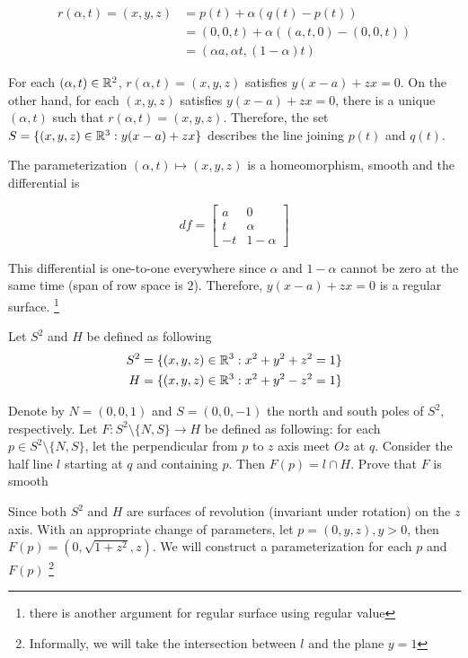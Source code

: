 \documentclass{article}
\begin{document}
\begin{align*}
    r(\alpha, t) = (x, y, z)
    &= p(t) + \alpha(q(t) - p(t)) \\
    &= (0, 0, t) + \alpha ((a, t, 0) - (0, 0, t)) \\
    &= (\alpha a, \alpha t, (1 - \alpha) t)
\end{align*}

For each $(\alpha, t) \in \mathbb{R}^2$, $r(\alpha, t) = (x, y, z)$ satisfies $y(x-a) + zx = 0$. On the other hand, for each $(x, y, z)$ satisfies $y(x-a) + zx = 0$, there is a unique $(\alpha, t)$ such that $r(\alpha, t) = (x, y, z)$. Therefore, the set $S = \{(x, y, z) \in \mathbb{R}^3: y(x-a) + zx\}$ describes the line joining $p(t)$ and $q(t)$.

The parameterization $(\alpha, t) \mapsto (x, y, z)$ is a homeomorphism, smooth and the differential is

\[
    df = 
    \begin{bmatrix}
    a & 0\\
    t & \alpha\\
    -t & 1-\alpha
    \end{bmatrix}
\]

This differential is one-to-one everywhere since $\alpha$ and $1 - \alpha$ cannot be zero at the same time (span of row space is $2$). Therefore, $y(x-a) + zx = 0$ is a regular surface. \footnote{there is another argument for regular surface using regular value}

\begin{problem}
    Let $S^2$ and $H$ be defined as following
    \begin{align*}
        S^2 &= \{(x, y, z) \in \mathbb{R}^3: x^2 + y^2 + z^2 = 1 \} \\
        H   &= \{(x, y, z) \in \mathbb{R}^3: x^2 + y^2 - z^2 = 1\}
    \end{align*}

    Denote by $N = (0, 0, 1)$ and $S = (0, 0, -1)$ the north and south poles of $S^2$, respectively. Let $F: S^2 \setminus \{N, S \} \to H$ be defined as following: for each $p \in S^2 \setminus \{N, S \}$, let the perpendicular from $p$ to $z$ axis meet $Oz$ at $q$. Consider the half line $l$ starting at $q$ and containing $p$. Then $F(p) = l \cap H$.
    Prove that $F$ is smooth
\end{problem}

Since both $S^2$ and $H$ are surfaces of revolution (invariant under rotation) on the $z$ axis. With an appropriate change of parameters, let $p = (0, y, z), y > 0$, then $F(p) = (0, \sqrt{1+z^2}, z)$. We will construct a parameterization for each $p$ and $F(p)$ \footnote{Informally, we will take the intersection between $l$ and the plane $y = 1$ }
\end{document}
